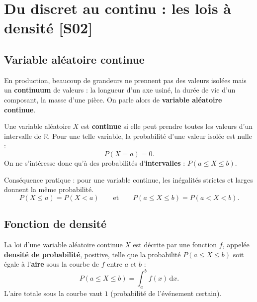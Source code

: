 \documentclass[a4paper,11pt]{article}
\begin{document}
\newpage
\tableofcontents
\newpage

\section{Du discret au continu : les lois à densité \hfill {\normalsize\color{uimmred}[S02]}}

\subsection{Variable aléatoire continue}

En production, beaucoup de grandeurs ne prennent pas des valeurs isolées mais un \textbf{continuum} de valeurs : la longueur d'un axe usiné, la durée de vie d'un composant, la masse d'une pièce. On parle alors de \textbf{variable aléatoire continue}.

\begin{definition}
Une variable aléatoire $X$ est \textbf{continue} si elle peut prendre toutes les valeurs d'un intervalle de $\mathbb{R}$. Pour une telle variable, la probabilité d'une valeur isolée est nulle :
\[
P(X = a) = 0.
\]
On ne s'intéresse donc qu'à des probabilités d'\textbf{intervalles} : $P(a \leq X \leq b)$.
\end{definition}

\begin{remarque}
Conséquence pratique : pour une variable continue, les inégalités strictes et larges donnent la même probabilité.
\[
P(X \leq a) = P(X < a) \qquad\text{et}\qquad P(a \leq X \leq b) = P(a < X < b).
\]
\end{remarque}

\subsection{Fonction de densité}

\begin{definition}
La loi d'une variable aléatoire continue $X$ est décrite par une fonction $f$, appelée \textbf{densité de probabilité}, positive, telle que la probabilité $P(a \leq X \leq b)$ soit égale à l'\textbf{aire} sous la courbe de $f$ entre $a$ et $b$ :
\[
P(a \leq X \leq b) = \int_a^b f(x)\,\mathrm{d}x.
\]
L'aire totale sous la courbe vaut $1$ (probabilité de l'événement certain).
\end{definition}
\end{document}
